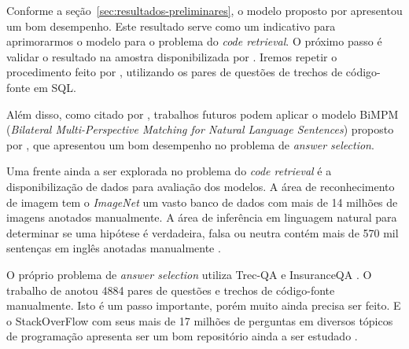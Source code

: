 \documentclass[12pt]{article}
\begin{document}
Conforme a seção~\ref{sec:resultados-preliminares}, o modelo proposto por \cite{tan-lstm-qa} apresentou um bom desempenho. Este resultado serve como um indicativo para aprimorarmos o modelo para o problema do \textit{code retrieval}. O próximo passo é validar o resultado na amostra disponibilizada por \cite{iyer-etal-2016-summarizing}. Iremos repetir o procedimento feito por \cite{Yao-staqc:2018}, utilizando os pares de questões de trechos de código-fonte em SQL.

Além disso, como citado por \cite{lai-etal-2018-review}, trabalhos futuros podem aplicar o modelo BiMPM (\textit{Bilateral Multi-Perspective Matching for Natural Language Sentences}) proposto por \cite{wang-BiMPM-2017}, que apresentou um bom desempenho no problema de \textit{answer selection}.

Uma frente ainda a ser explorada no problema do \textit{code retrieval} é a disponibilização de dados para avaliação dos modelos. A área de reconhecimento de imagem tem o \textit{ImageNet} \cite{imagenet_cvpr09} um vasto banco de dados com mais de 14 milhões de imagens anotados manualmente. A área de inferência em linguagem natural para determinar se uma hipótese é verdadeira, falsa ou neutra contém mais de 570 mil sentenças em inglês anotadas manualmente \cite{snli:emnlp2015}. 

O próprio problema de \textit{answer selection} utiliza Trec-QA \cite{wang-etal-2007-jeopardy} e InsuranceQA \cite{feng-answer-selection-2015}. O trabalho de \cite{Yao-staqc:2018} anotou 4884 pares de questões e trechos de código-fonte manualmente. Isto é um passo importante, porém muito ainda precisa ser feito. E o StackOverFlow com seus mais de 17 milhões de perguntas em diversos tópicos de programação apresenta ser um bom repositório ainda a ser estudado \cite{stackoverflow-survey-2019}.







\end{document}
